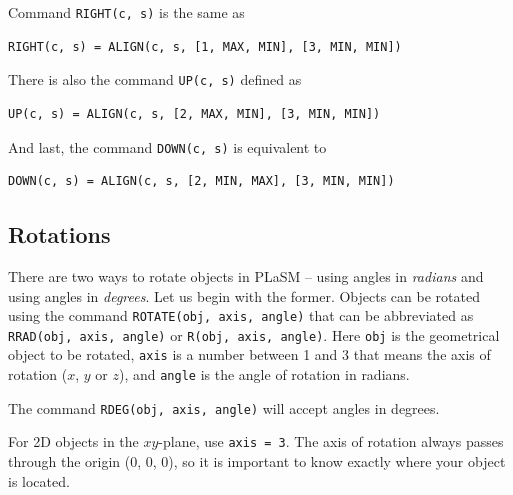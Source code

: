 \noindent
Command {\tt RIGHT(c, s)} is the same as\\

\begin{bbox}
\begin{verbatim}
RIGHT(c, s) = ALIGN(c, s, [1, MAX, MIN], [3, MIN, MIN])
\end{verbatim}
\end{bbox}
\vspace{6mm}

\noindent
There is also the command {\tt UP(c, s)} defined as\\

\begin{bbox}
\begin{verbatim}
UP(c, s) = ALIGN(c, s, [2, MAX, MIN], [3, MIN, MIN])
\end{verbatim}
\end{bbox}
\vspace{6mm}

\noindent
And last, the command {\tt DOWN(c, s)} is equivalent to\\

\begin{bbox}
\begin{verbatim}
DOWN(c, s) = ALIGN(c, s, [2, MIN, MAX], [3, MIN, MIN])
\end{verbatim}
\end{bbox}
\vspace{6mm}

\noindent

\subsection{Rotations}

There are two ways to rotate objects in PLaSM -- using angles in 
{\em radians} and using angles in {\em degrees}. Let us begin with the former.
Objects can be rotated using the command {\tt ROTATE(obj, axis, angle)} 
that can be abbreviated as {\tt RRAD(obj, axis, angle)} or {\tt R(obj, axis, angle)}. 
Here {\tt obj} is the geometrical object to be rotated, {\tt axis} is a number between 
1 and 3 that means the axis of rotation ($x$, $y$ or $z$), and {\tt angle} is the 
angle of rotation in radians. 

The command {\tt RDEG(obj, axis, angle)} will accept 
angles in degrees.

For 2D objects in the $xy$-plane, use {\tt axis = 3}. The axis of rotation 
always passes through the origin (0, 0, 0), so it is important 
to know exactly where your object is located. 

